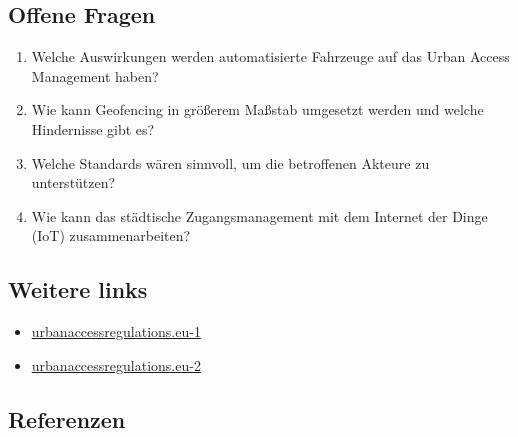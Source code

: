 \documentclass[
]{book}
\providecommand{\tightlist}{%
  \setlength{\itemsep}{0pt}\setlength{\parskip}{0pt}}
\begin{document}
\hypertarget{offene-fragen-17}{%
\subsection*{Offene Fragen}\label{offene-fragen-17}}

\begin{enumerate}
\def\labelenumi{\arabic{enumi}.}
\tightlist
\item
  Welche Auswirkungen werden automatisierte Fahrzeuge auf das Urban Access Management haben?
\item
  Wie kann Geofencing in größerem Maßstab umgesetzt werden und welche Hindernisse gibt es?
\item
  Welche Standards wären sinnvoll, um die betroffenen Akteure zu unterstützen?
\item
  Wie kann das städtische Zugangsmanagement mit dem Internet der Dinge (IoT) zusammenarbeiten?
\end{enumerate}

\hypertarget{weitere-links-14}{%
\subsection*{Weitere links}\label{weitere-links-14}}

\begin{itemize}
\tightlist
\item
  \href{https://urbanaccessregulations.eu/urban-access-regulations/what-are-urban-access-regulations}{urbanaccessregulations.eu-1}
\item
  \href{https://urbanaccessregulations.eu/countries-mainmenu-147/austria-mainmenu-78/wien-vienna-emergency-scheme}{urbanaccessregulations.eu-2}
\end{itemize}

\hypertarget{referenzen-17}{%
\subsection*{Referenzen}\label{referenzen-17}}
\end{document}
